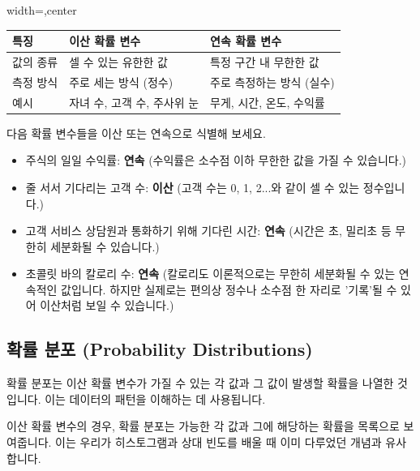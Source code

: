 \documentclass[11pt,a4paper]{book}
\theoremstyle{definition}
\begin{document}
\begin{infobox}[title={이산 vs. 연속 확률 변수 비교}]
\begin{adjustbox}{width=\textwidth,center}
\begin{tabular}{lll}
\toprule
\textbf{특징} & \textbf{이산 확률 변수} & \textbf{연속 확률 변수} \\
\midrule
값의 종류 & 셀 수 있는 유한한 값 & 특정 구간 내 무한한 값 \\
측정 방식 & 주로 세는 방식 (정수) & 주로 측정하는 방식 (실수) \\
예시 & 자녀 수, 고객 수, 주사위 눈 & 무게, 시간, 온도, 수익률 \\
\bottomrule
\end{tabular}
\end{adjustbox}
\end{infobox}

\begin{examplebox}[title={연습 문제: 이산 또는 연속 확률 변수 식별}]
다음 확률 변수들을 이산 또는 연속으로 식별해 보세요.
\begin{itemize}
    \item 주식의 일일 수익률: \textbf{연속} (수익률은 소수점 이하 무한한 값을 가질 수 있습니다.)
    \item 줄 서서 기다리는 고객 수: \textbf{이산} (고객 수는 0, 1, 2...와 같이 셀 수 있는 정수입니다.)
    \item 고객 서비스 상담원과 통화하기 위해 기다린 시간: \textbf{연속} (시간은 초, 밀리초 등 무한히 세분화될 수 있습니다.)
    \item 초콜릿 바의 칼로리 수: \textbf{연속} (칼로리도 이론적으로는 무한히 세분화될 수 있는 연속적인 값입니다. 하지만 실제로는 편의상 정수나 소수점 한 자리로 '기록'될 수 있어 이산처럼 보일 수 있습니다.)
\end{itemize}
\end{examplebox}


\subsection{확률 분포 (Probability Distributions)}

\begin{summarybox}[title={확률 분포 핵심 요약}]
확률 분포는 이산 확률 변수가 가질 수 있는 각 값과 그 값이 발생할 확률을 나열한 것입니다. 이는 데이터의 패턴을 이해하는 데 사용됩니다.
\end{summarybox}

이산 확률 변수의 경우, 확률 분포는 가능한 각 값과 그에 해당하는 확률을 목록으로 보여줍니다. 이는 우리가 히스토그램과 상대 빈도를 배울 때 이미 다루었던 개념과 유사합니다.
\end{document}
